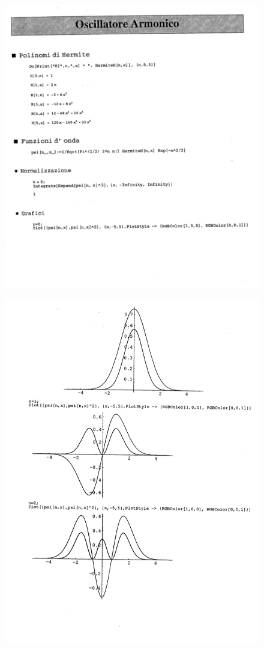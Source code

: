 \newpage
\begin{figure}[htbp]
\begin{center}
\includegraphics[width=\textwidth]{immagini/cap_11/polHer1.png}
\end{center}
\end{figure}

\begin{figure}[htbp]
\begin{center}
\includegraphics[width=\textwidth]{immagini/cap_11/polHer2.png}
\end{center}
\end{figure}
